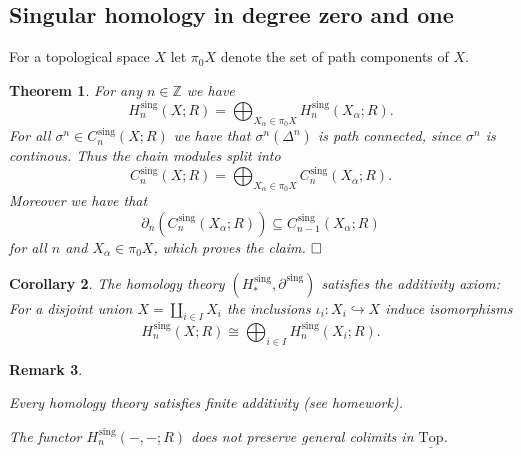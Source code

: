 \documentclass[11pt]{book}
\numberwithin{dummy}{section}
\newtheorem{theorem}{Theorem}[section]
\newtheorem{corollary}[theorem]{Corollary}
\newtheorem{remark}[theorem]{Remark}
\theoremstyle{nonumberbreak}
\newenvironment{pr}[1][]{\ifthenelse{\equal{#1}{}}{\proof}{\proof[#1]}\rm}{\endproof}
\newcommand{\topsp}{\underline{\mathrm{Top}}}
\newcommand{\Z}{\mathbb{Z}}
\newcommand{\Cs}{C^{\hspace{1pt}\mathrm{sing}}}
\newcommand{\parts}{\partial^{\hspace{1pt} \mathrm{sing}}}
\newcommand{\Hs}{H^{\hspace{1pt}\mathrm{sing}}}
\begin{document}
\begin{spacing}{1.4}
\section{Singular homology in degree zero and one} %




For a topological space $X$ let $\pi_0X$ denote the set of path components of $X$.


\begin{theorem}
For any $n \in \Z$ we have
$$\Hs_n(X;R) = \bigoplus_{ X_{\alpha} \in \pi_0X} \Hs_n(X_{\alpha};R).$$
\begin{pr}
For all $\sigma^n \in \Cs_n(X;R)$ we have that $\sigma^n(\Delta^n)$ is path connected, since $\sigma^n$ is continous. Thus the chain modules split into
$$\Cs_n(X;R) = \bigoplus_{X_{\alpha} \in \pi_0X} \Cs_n(X_{\alpha};R).$$
Moreover we have that 
$$\partial_{n} \left( \Cs_n(X_{\alpha};R)\right) \subseteq \Cs_{n-1}(X_{\alpha};R)$$
for all $n$ and $X_{\alpha} \in \pi_0X$, which proves the claim. $\hfill \Box$

\end{pr}

\end{theorem}



\begin{corollary}
The homology theory $(\Hs_*, \parts)$ satisfies the additivity axiom: For a disjoint union $X= \amalg_{i \in I} X_i$ the inclusions $\iota_i: X_i \hookrightarrow X$ induce isomorphisms
$$\Hs_n(X;R) \cong \bigoplus_{i \in I} \Hs_n(X_i; R).$$



\end{corollary}


\begin{remark}
\begin{compactenum}
\item Every homology theory satisfies finite additivity (see homework).
\item The functor $\Hs_n(-,-;R)$ does not preserve general colimits in $\topsp$.

\end{compactenum}

\end{remark}



\end{spacing}
\end{document}
